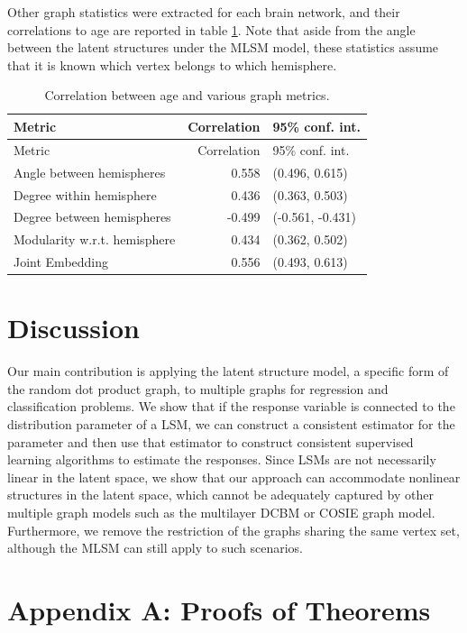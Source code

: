 \documentclass[12pt]{article}
\begin{document}
Other graph statistics were extracted for each brain network, and their
correlations to age are reported in table \ref{tab:cor-comparison}. Note
that aside from the angle between the latent structures under the MLSM
model, these statistics assume that it is known which vertex belongs to
which hemisphere.

\begin{longtable}[]{@{}lrl@{}}
\caption{Correlation between age and various graph
metrics.\label{tab:cor-comparison}}\tabularnewline
\toprule\noalign{}
Metric & Correlation & 95\% conf. int. \\
\midrule\noalign{}
\endfirsthead
\toprule\noalign{}
Metric & Correlation & 95\% conf. int. \\
\midrule\noalign{}
\endhead
\bottomrule\noalign{}
\endlastfoot
Angle between hemispheres & 0.558 & (0.496, 0.615) \\
Degree within hemisphere & 0.436 & (0.363, 0.503) \\
Degree between hemispheres & -0.499 & (-0.561, -0.431) \\
Modularity w.r.t. hemisphere & 0.434 & (0.362, 0.502) \\
Joint Embedding & 0.556 & (0.493, 0.613) \\
\end{longtable}

\section{Discussion}\label{discussion}

Our main contribution is applying the latent structure model, a specific
form of the random dot product graph, to multiple graphs for regression
and classification problems. We show that if the response variable is
connected to the distribution parameter of a LSM, we can construct a
consistent estimator for the parameter and then use that estimator to
construct consistent supervised learning algorithms to estimate the
responses. Since LSMs are not necessarily linear in the latent space, we
show that our approach can accommodate nonlinear structures in the
latent space, which cannot be adequately captured by other multiple
graph models such as the multilayer DCBM or COSIE graph model.
Furthermore, we remove the restriction of the graphs sharing the same
vertex set, although the MLSM can still apply to such scenarios.

\section*{Appendix A: Proofs of Theorems}
\end{document}
